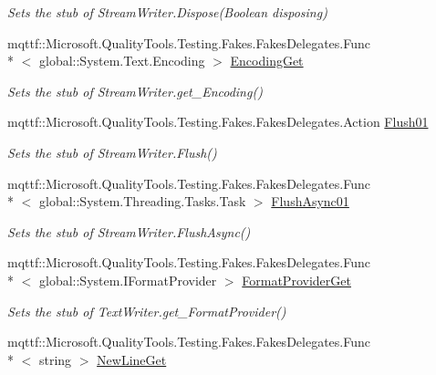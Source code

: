\begin{DoxyCompactItemize}
\begin{DoxyCompactList}\small\item\em Sets the stub of Stream\-Writer.\-Dispose(\-Boolean disposing)\end{DoxyCompactList}\item 
mqttf\-::\-Microsoft.\-Quality\-Tools.\-Testing.\-Fakes.\-Fakes\-Delegates.\-Func\\*
$<$ global\-::\-System.\-Text.\-Encoding $>$ \hyperlink{class_system_1_1_i_o_1_1_fakes_1_1_stub_stream_writer_ab8453a15569ef8291ebe08b308ef64f7}{Encoding\-Get}
\begin{DoxyCompactList}\small\item\em Sets the stub of Stream\-Writer.\-get\-\_\-\-Encoding()\end{DoxyCompactList}\item 
mqttf\-::\-Microsoft.\-Quality\-Tools.\-Testing.\-Fakes.\-Fakes\-Delegates.\-Action \hyperlink{class_system_1_1_i_o_1_1_fakes_1_1_stub_stream_writer_ac273e50d57c80b0039062e68db436d43}{Flush01}
\begin{DoxyCompactList}\small\item\em Sets the stub of Stream\-Writer.\-Flush()\end{DoxyCompactList}\item 
mqttf\-::\-Microsoft.\-Quality\-Tools.\-Testing.\-Fakes.\-Fakes\-Delegates.\-Func\\*
$<$ global\-::\-System.\-Threading.\-Tasks.\-Task $>$ \hyperlink{class_system_1_1_i_o_1_1_fakes_1_1_stub_stream_writer_af01d08c89d0dce9daa4f081ec6442851}{Flush\-Async01}
\begin{DoxyCompactList}\small\item\em Sets the stub of Stream\-Writer.\-Flush\-Async()\end{DoxyCompactList}\item 
mqttf\-::\-Microsoft.\-Quality\-Tools.\-Testing.\-Fakes.\-Fakes\-Delegates.\-Func\\*
$<$ global\-::\-System.\-I\-Format\-Provider $>$ \hyperlink{class_system_1_1_i_o_1_1_fakes_1_1_stub_stream_writer_adc9b68620d8bebe4d41b02e3f4b0ecd2}{Format\-Provider\-Get}
\begin{DoxyCompactList}\small\item\em Sets the stub of Text\-Writer.\-get\-\_\-\-Format\-Provider()\end{DoxyCompactList}\item 
mqttf\-::\-Microsoft.\-Quality\-Tools.\-Testing.\-Fakes.\-Fakes\-Delegates.\-Func\\*
$<$ string $>$ \hyperlink{class_system_1_1_i_o_1_1_fakes_1_1_stub_stream_writer_a787dcb09f699b3cdcdf8a036a4151552}{New\-Line\-Get}

\end{DoxyCompactItemize}
